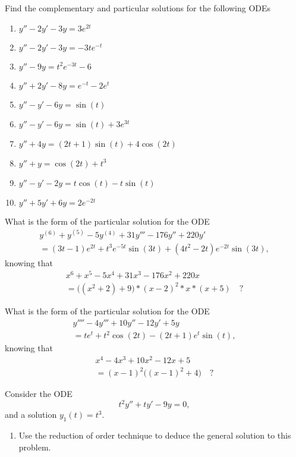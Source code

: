 \begin{exercises}

	\begin{problist}

	\prob Find the complementary and particular solutions for the following ODEs
	\begin{enumerate}
		\item $y''-2y'-3y=3e^{2t}$
		\item $y''-2y'-3y=-3te^{-t}$
		\item $y''-9y=t^2e^{-3t}-6$
		\item $y''+2y'-8y=e^{-t}-2e^t$
		\item $y''-y'-6y=\sin(t)$
		\item $y''-y'-6y=\sin(t)+3e^{3t}$
		\item $y''+4y=(2t+1)\sin(t) + 4\cos(2t)$
		\item $y''+y=\cos(2t)+t^3$
		\item $y''-y'-2y=t\cos(t) - t\sin(t)$
		\item $y''+5y'+6y = 2e^{-2t}$
	\end{enumerate}



	\prob What is the form of the particular solution for the ODE
	\begin{multline*}
		y^{(6)} + y^{(5)} -5 y^{(4)} + 31 y'''-176y''+220y' \\
			= (3t-1)e^{2t} + t^3e^{-5t}\sin(3t) + (4t^2-2t) e^{-2t} \sin(3t),
	\end{multline*}
	knowing that 
	\begin{multline*}
		x^6 + x^5 - 5 x^4 + 31 x^3 - 176 x^2 + 220 x \\
			= \big((x^2+2)+9\big)*(x-2)^2*x*(x+5)\quad ?
	\end{multline*}

	\prob What is the form of the particular solution for the ODE
	\begin{multline*}
		y'''' - 4 y''' + 10y'' - 12 y' + 5y \\
			= t e^t + t^2 \cos(2t) - (2t+1) e^t \sin(t),
	\end{multline*}
	knowing that 
	\begin{multline*}
		x^4 - 4x^3 + 10 x^2 - 12 x + 5 \\
			= (x-1)^2 \big( (x-1)^2+4\big)\quad  ?
	\end{multline*}

	\prob Consider the ODE
	$$
	t^2 y''+ty'-9y = 0,
	$$
	and a solution $y_1(t) = t^3$.
	
	\begin{enumerate}
		\item Use the reduction of order technique to deduce the general solution to this problem.
		

\end{enumerate}
\end{problist}
\end{exercises}
